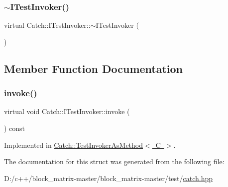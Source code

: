 \subsubsection{\texorpdfstring{$\sim$\+I\+Test\+Invoker()}{~ITestInvoker()}}
{\footnotesize\ttfamily virtual Catch\+::\+I\+Test\+Invoker\+::$\sim$\+I\+Test\+Invoker (\begin{DoxyParamCaption}{ }\end{DoxyParamCaption})\hspace{0.3cm}{\ttfamily [virtual]}}



\subsection{Member Function Documentation}
\mbox{\label{struct_catch_1_1_i_test_invoker_a6fcd5c5b67d6d5ade6491ff33411ca7f}} 
\subsubsection{\texorpdfstring{invoke()}{invoke()}}
{\footnotesize\ttfamily virtual void Catch\+::\+I\+Test\+Invoker\+::invoke (\begin{DoxyParamCaption}{ }\end{DoxyParamCaption}) const\hspace{0.3cm}{\ttfamily [pure virtual]}}



Implemented in \mbox{\hyperlink{class_catch_1_1_test_invoker_as_method_a8115a06efe273f4112ec0b5452c1b5f2}{Catch\+::\+Test\+Invoker\+As\+Method$<$ C $>$}}.



The documentation for this struct was generated from the following file\+:\begin{DoxyCompactItemize}
\item 
D\+:/c++/block\+\_\+matrix-\/master/block\+\_\+matrix-\/master/test/\mbox{\hyperlink{catch_8hpp}{catch.\+hpp}}\end{DoxyCompactItemize}
